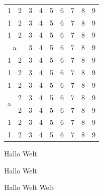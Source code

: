 \documentclass[12pt,parskip=half]{scrartcl}
\begin{document}
\begin{tabular}{ccccccccc}
1 & 2 & 3 & 4 & 5 & 6 & 7 & 8 & 9 \\
1 & 2 & 3 & 4 & 5 & 6 & 7 & 8 & 9 \\
1 & 2 & 3 & 4 & 5 & 6 & 7 & 8 & 9 \\
\multicolumn{2}{c}{a} & 3 & 4 & 5 & 6 & 7 & 8 & 9 \\
1 & 2 & 3 & 4 & 5 & 6 & 7 & 8 & 9 \\
1 & 2 & 3 & 4 & 5 & 6 & 7 & 8 & 9 \\
1 & 2 & 3 & 4 & 5 & 6 & 7 & 8 & 9 \\
\multirow[c]{2}{*}{a} & 2 & 3 & 4 & 5 & 6 & 7 & 8 & 9 \\
  & 2 & 3 & 4 & 5 & 6 & 7 & 8 & 9 \\
1 & 2 & 3 & 4 & 5 & 6 & 7 & 8 & 9 \\
1 & 2 & 3 & 4 & 5 & 6 & 7 & 8 & 9 \\
\end{tabular}

Hallo Welt

Hallo \hspace*{1cm}       Welt

Hallo \hfill Welt \vfill Welt
\end{document}
